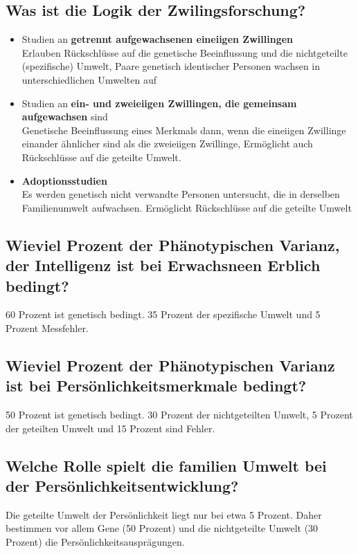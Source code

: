 \documentclass[a6paper,9pt,DIV=14]{scrartcl}
\begin{document}
\subsection{Was ist die Logik der Zwilingsforschung?} %
\begin{itemize}
\item Studien an \textbf{getrennt aufgewachsenen eineiigen Zwillingen}\\
Erlauben Rückschlüsse auf die genetische Beeinflussung und die nichtgeteilte
(spezifische) Umwelt, Paare genetisch identischer Personen wachsen in unterschiedlichen Umwelten auf

\item Studien an \textbf{ein- und zweieiigen Zwillingen, die gemeinsam aufgewachsen} sind\\
Genetische Beeinflussung eines Merkmals dann, wenn die eineiigen Zwillinge einander ähnlicher sind als die zweieiigen Zwillinge, Ermöglicht auch Rückschlüsse auf die geteilte Umwelt.

\item \textbf{Adoptionsstudien}\\
Es werden genetisch nicht verwandte Personen untersucht, die in derselben
Familienumwelt aufwachsen. Ermöglicht Rückschlüsse auf die geteilte Umwelt
\end{itemize}
\subsection{Wieviel Prozent der Phänotypischen Varianz, der Intelligenz ist bei Erwachsneen Erblich bedingt?}
60 Prozent ist genetisch bedingt. 35 Prozent der spezifische Umwelt und 5 Prozent Messfehler.
\subsection{Wieviel Prozent der Phänotypischen Varianz ist bei Persönlichkeitsmerkmale bedingt?} %
50 Prozent ist genetisch bedingt. 30 Prozent der nichtgeteilten Umwelt, 5 Prozent der geteilten Umwelt und 15 Prozent sind Fehler.
\subsection{Welche Rolle spielt die familien Umwelt bei der Persönlichkeitsentwicklung?}
Die geteilte Umwelt der Persönlichkeit liegt nur bei etwa 5 Prozent. Daher bestimmen vor allem Gene (50 Prozent) und die nichtgeteilte Umwelt (30 Prozent) die Persönlichkeitsausprägungen.
    
\end{document}
